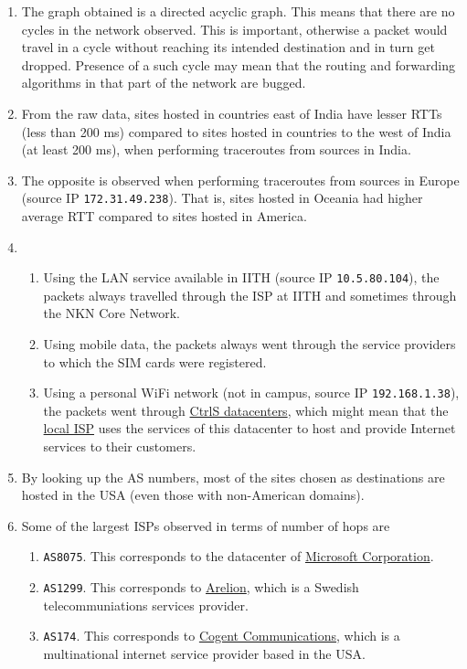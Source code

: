 \documentclass[journal,12pt,twocolumn]{IEEEtran}
\begin{document}
\begin{enumerate}
     \item The graph obtained is a directed acyclic graph. This means that there
     are no cycles in the network observed. This is important, otherwise a
     packet would travel in a cycle without reaching its intended destination
     and in turn get dropped. Presence of a such cycle may mean that the routing
     and forwarding algorithms in that part of the network are bugged. 
     \item From the raw data, sites hosted in countries east of India have
     lesser RTTs (less than 200 ms) compared to sites hosted in countries to the
     west of India (at least 200 ms), when performing traceroutes from sources
     in India.
     \item The opposite is observed when performing traceroutes from sources in
     Europe (source IP \texttt{172.31.49.238}). That is, sites hosted in Oceania
     had higher average RTT compared to sites hosted in America.
     \item 
     \begin{enumerate}
          \item Using the LAN service available in IITH (source IP
          \texttt{10.5.80.104}), the packets always travelled through the ISP at
          IITH and sometimes through the NKN Core Network.
          \item Using mobile data, the packets always went through the service
          providers to which the SIM cards were registered.
          \item Using a personal WiFi network (not in campus, source IP
          \texttt{192.168.1.38}), the packets went through
          \href{https://www.ctrls.in/}{CtrlS datacenters}, which might mean that
          the \href{https://reachtele.net/}{local ISP} uses the services of this
          datacenter to host and provide Internet services to their customers.
     \end{enumerate}
     \item By looking up the AS numbers, most of the sites chosen as
     destinations are hosted in the USA (even those with non-American domains).
     \item Some of the largest ISPs observed in terms of number of hops are 
     \begin{enumerate}
          \item \texttt{AS8075}. This corresponds to the datacenter of
          \href{https://www.microsoft.com/en-in}{Microsoft Corporation}.
          \item \texttt{AS1299}. This corresponds to
          \href{https://www.arelion.com/}{Arelion}, which is a Swedish
          telecommuniations services provider.
          \item \texttt{AS174}. This corresponds to
          \href{https://www.cogentco.com/en/}{Cogent Communications}, which is a
          multinational internet service provider based in the USA.
     \end{enumerate}
\end{enumerate}
\end{document}
